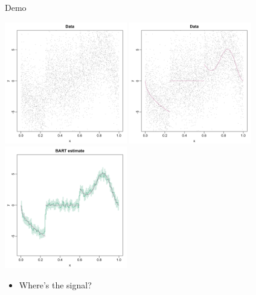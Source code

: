 \documentclass[aspectratio=199]{beamer}
\begin{document}
\begin{frame}{Demo}

\begin{overprint}
\centering\includegraphics[width = 0.4\textwidth]{figures/demo_data}
\centering\includegraphics[width = 0.4\textwidth]{figures/demo_function}
\centering\includegraphics[width = 0.4\textwidth]{figures/demo_fitted}
\end{overprint}

\begin{itemize}
\item{Where's the signal?}
\end{itemize}

\end{frame}
\end{document}
